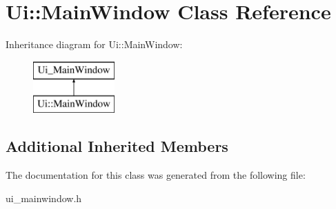 \hypertarget{classUi_1_1MainWindow}{\section{Ui\-:\-:Main\-Window Class Reference}
\label{classUi_1_1MainWindow}
}
Inheritance diagram for Ui\-:\-:Main\-Window\-:\begin{figure}[H]
\begin{center}
\leavevmode
\includegraphics[height=2.000000cm]{classUi_1_1MainWindow}
\end{center}
\end{figure}
\subsection*{Additional Inherited Members}


The documentation for this class was generated from the following file\-:\begin{DoxyCompactItemize}
\item 
ui\-\_\-mainwindow.\-h\end{DoxyCompactItemize}
